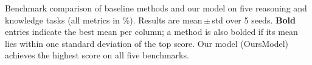 \caption{Benchmark comparison of baseline methods and our model on five reasoning and knowledge tasks (all metrics in \%). Results are mean\,$\pm$\,std over 5 seeds. \textbf{Bold} entries indicate the best mean per column; a method is also bolded if its mean lies within one standard deviation of the top score. Our model (OursModel) achieves the highest score on all five benchmarks.}

